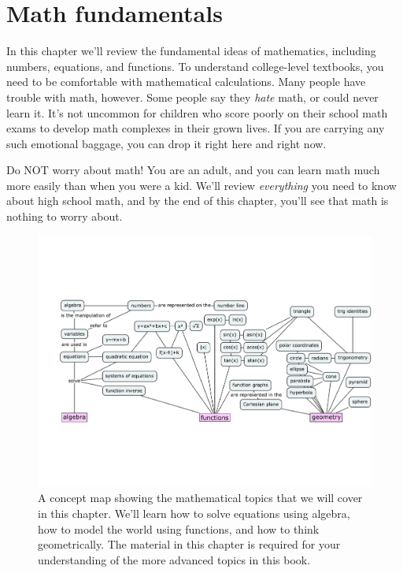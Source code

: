 
%
%

\chapter{Math fundamentals}
\label{chapter:math_fundamentals}

In this chapter we'll review the fundamental ideas of mathematics, including numbers, equations, and functions.  
To understand college-level textbooks, you need to be comfortable with mathematical calculations.
Many people have trouble with math, however. 
Some people say they \emph{hate} math, or could never learn it. 
It's not uncommon for children who score poorly on their school math exams to develop math complexes in their grown lives.
If you are carrying any such emotional baggage, you can drop it right here and right now.

Do NOT worry about math! 
You are an adult, and you can learn math much more easily than when you were a kid.
We'll review \emph{everything} you need to know about high school math, and by the end of this chapter, 
you'll see that math is nothing to worry about.

\smallskip

\begin{figure}[H]
\centering
\! \includegraphics[width=1.01\textwidth]{figures/concept_maps/precalculus.pdf}
	\caption{A concept map showing the mathematical topics that we will cover in this chapter.
			We'll learn how to solve equations using algebra, 
			how to model the world using functions,
			and how to think geometrically.
			The material in this chapter is required for your understanding of the more advanced topics in this book.}
\label{fig:precalculus_concept_map}
\end{figure}

